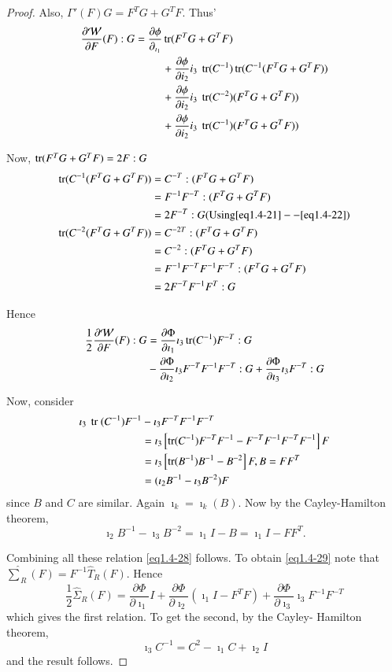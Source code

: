\begin{proof}
Also, $\Gamma'(F)G=F^TG +  G^TF$. Thus'
\begin{align*}
  \frac{\partial \mathcal{W}}{\partial F}(F):G=\frac{\partial
    \phi}{\partial_{\imath_1}}& \operatorname{tr}(F^TG+G^TF)\\ 
  & +\frac{\partial \phi}{\partial i_2}i_3 ~\operatorname{tr} (C^{-1}) \operatorname{tr} (C^{-1}(F^TG+G^TF))\\
  & +\frac{\partial \phi}{\partial i_2}i_3 ~\operatorname{tr} (C^{-2}) (F^TG+G^TF))\\
  & +\frac{\partial \phi}{\partial i_2}i_3 ~\operatorname{tr} (C^{-1}) (F^TG+G^TF))
\end{align*}

Now, $\operatorname{tr} (F^TG+G^TF)=2F:G$
\begin{align*}
  \operatorname{tr} (C^{-1}(F^TG+G^TF)) &=C^{-T}:(F^TG+G^TF)\\
  & =F^{-1}F^{-T}:(F^TG+G^TF)\\
  & =2F^{-T}:G \text{(Using} \eqref{eq1.4-21}--\eqref{eq1.4-22})\\
  \operatorname{tr}(C^{-2}(F^T G + G^T F)) &= C^{-2T}: (F^T G+ G^TF)\\
  &= C^{-2}: (F^T G + G^T F)\\
  &= F^{-1} F^{-T} F^{-1} F^{-T} : (F^T G + G^T F)\\
  &= 2F^{-T} F^{-1} F^{T}: G
\end{align*}\pageoriginale

Hence 
\begin{align*}
  \frac{1}{2} \frac{\partial \mathcal{W}}{\partial F}(F): G &=
  \frac{\partial \Phi}{\partial \imath_1} \imath_3 \operatorname{tr} (C^{-1}) F^{-T} : G\\ 
  &- \frac{\partial \Phi}{\partial \imath_2} \imath_3 F^{-T} F^{-1} F^{-T} : G +
  \frac{\partial \Phi}{\partial \imath_3} \imath_3 F^{-T} : G 
\end{align*}

Now, consider
\begin{align*}
  \imath_3 ~\operatorname{tr}~ (C^{-1}) F^{-1} & - \imath_3 F^{-T} F^{-1} F^{-T}\\
  &=\imath_3\left[\operatorname{tr} (C^{-1}) F^{-T} F^{-1} -F^{-T} F^{-1} F^{-T} F^{-1}\right] F\\
  &= \imath_3 \left[\operatorname{tr} (B^{-1}) B^{-1} - B^{-2}\right] F, B= FF^T\\
  &= (\imath_2 B^{-1} - \imath_3 B^{-2})F
\end{align*}
since $B$ and $C$ are similar. Again $\imath_k = \imath_k(B)$. Now by the
Cayley-Hamilton theorem, 
$$
\imath_2 B^{-1} - \imath_3 B^{-2} = \imath_1 I-B = \imath_1 I-FF^T.
$$

Combining all these relation \eqref{eq1.4-28} follows. To obtain
\eqref{eq1.4-29} note 
that $\hat{\sum}_R (F) = F^{-1} \hat{T}_R (F)$. Hence 
$$
\frac{1}{2} \hat{\Sigma}_R (F)= \frac{\partial \Phi}{\partial \imath_1} I +
\frac{\partial \Phi}{\partial \imath_2} ( \imath_1 I-F^T F) + \frac{\partial
  \Phi}{\partial \imath_3}\imath_3 F^{-1} F^{-T} 
$$
which gives the first relation. To get the second, by the Cayley-
Hamilton theorem, 
$$
\imath_3 C^{-1} = C^2 - \imath_1 C+\imath_2 I
$$\pageoriginale
and the result follows.
\end{proof}

